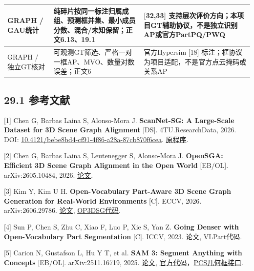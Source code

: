 \documentclass[UTF8,fontset=fandol]{ctexart}
\begin{document}
{\begin{longtable}{|p{}|p{}|p{}|}
GRAPH / GAU统计 & 纯碎片按同一标注归属成组、预测框并集、最小成员分数、混合/未知保留；正文6.13、19.1 & [32,33] 支持层次评价方向；本项目GT辅助协议，不是独立识别AP或官方PartPQ/PWQ \\ \hline
GRAPH / 独立GT核对 & 可观测GT筛选、严格一对一框AP、MVO、数量对数误差；正文6 & 官方Hypersim [18] 标注；框协议为项目适配，不是官方点云掩码或关系AP \\ \hline
\end{longtable}
}

\subsection*{29.1 参考文献}

[1] Chen G, Barbas Laina S, Alonso-Mora J. \textbf{ScanNet-SG: A Large-Scale Dataset for 3D Scene Graph Alignment} [DS]. 4TU.ResearchData, 2026. DOI: \href{https://data.4tu.nl/datasets/bebe8bd4-cf91-4f86-a28a-87cb870f6cea}{10.4121/bebe8bd4-cf91-4f86-a28a-87cb870f6cea}. \href{https://github.com/tud-amr/ScanNet-SG}{原程序}.



[2] Chen G, Barbas Laina S, Leutenegger S, Alonso-Mora J. \textbf{OpenSGA: Efficient 3D Scene Graph Alignment in the Open World} [EB/OL]. arXiv:2605.10484, 2026. \href{https://arxiv.org/abs/2605.10484}{论文}.



[3] Kim Y, Kim U H. \textbf{Open-Vocabulary Part-Aware 3D Scene Graph Generation for Real-World Environments} [C]. ECCV, 2026. arXiv:2606.29786. \href{https://arxiv.org/abs/2606.29786}{论文}, \href{https://github.com/AutoCompSysLab/OP3DSG}{OP3DSG代码}.



[4] Sun P, Chen S, Zhu C, Xiao F, Luo P, Xie S, Yan Z. \textbf{Going Denser with Open-Vocabulary Part Segmentation} [C]. ICCV, 2023. \href{https://openaccess.thecvf.com/content/ICCV2023/papers/Sun\_Going\_Denser\_with\_Open-Vocabulary\_Part\_Segmentation\_ICCV\_2023\_paper.pdf}{论文}, \href{https://github.com/facebookresearch/VLPart}{VLPart代码}.



[5] Carion N, Gustafson L, Hu Y T, et al. \textbf{SAM 3: Segment Anything with Concepts} [EB/OL]. arXiv:2511.16719, 2025. \href{https://arxiv.org/abs/2511.16719}{论文}, \href{https://github.com/facebookresearch/sam3}{官方代码}，\href{https://github.com/facebookresearch/sam3/blob/main/sam3/model/sam3\_image.py}{PCS几何框接口}.
\end{document}
